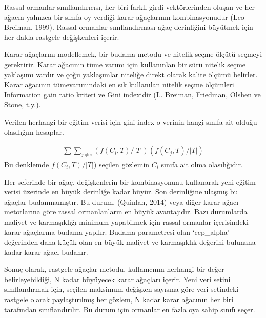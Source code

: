 \documentclass[12pt,twoside]{deuthesis}
\begin{document}
Rassal ormanlar sınıflandırıcısı, her biri farklı girdi vektörlerinden oluşan ve her ağacın yalnızca bir sınıfa oy verdiği karar ağaçlarının kombinasyonudur (Leo Breiman, 1999). Rassal ormanlar sınıflandırması ağaç derinliğini büyütmek için her dalda rastgele değişkenleri içerir.

Karar ağaçlarını modellemek, bir budama metodu ve nitelik seçme ölçütü seçmeyi gerektirir. Karar ağacının tüme varımı için kullanınlan bir sürü nitelik seçme yaklaşımı vardır ve çoğu yaklaşımlar niteliğe direkt olarak kalite ölçümü belirler. Karar ağacının tümevarımındaki en sık kullanılan nitelik seçme ölçümleri Information gain ratio kriteri ve Gini indexidir (L. Breiman, Friedman, Olshen ve Stone, t.y.).

Verilen herhangi bir eğitim verisi için gini index o verinin hangi sınıfa ait olduğu olasılığını hesaplar.

\[\begin{aligned}
\sum \sum_{j \neq i}(f(C_{i}, T) /|T|)(f(C_{j}, T) /|T|)
\end{aligned}\]
Bu denklemde \(f(C_{i}, T) /|T|)\) seçilen gözlemin \(C_{i}\) sınıfa ait olma olasılığıdır.

Her seferinde bir ağaç, değişkenlerin bir kombinasyonunu kullanarak yeni eğitim verisi üzerinde en büyük derinliğe kadar büyür. Son derinliğine ulaşmış bu ağaçlar budanmamıştır. Bu durum, (Quinlan, 2014) veya diğer karar ağacı metotlarına göre rassal ormanlanların en büyük avantajıdır. Bazı durumlarda maliyet ve karmaşıklığı minimum yapabilmek için rassal ormanlar içerisindeki karar ağaçlarına budama yapılır. Budama parametresi olan `ccp\_alpha' değerinden daha küçük olan en büyük maliyet ve karmaşıklık değerini bulunana kadar karar ağacı budanır.

Sonuç olarak, rastgele ağaçlar metodu, kullanıcının herhangi bir değer belirleyebildiği, N kadar büyüyecek karar ağaçları içerir. Yeni veri setini sınıflandırmak için, seçilen maksimum değişken sayısına göre veri setindeki rastgele olarak paylaştırılmış her gözlem, N kadar karar ağacının her biri tarafından sınıflandırılır. Bu durum için ormanlar en fazla oya sahip sınıfı seçer.\\
\end{document}
